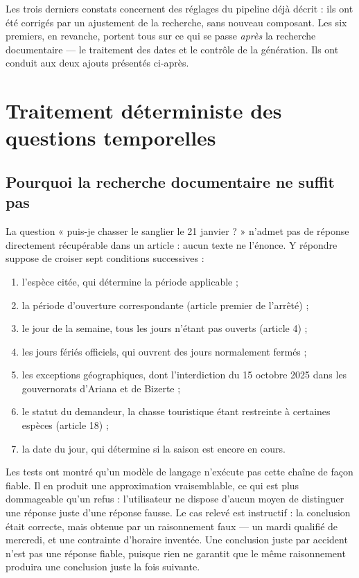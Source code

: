 Les trois derniers constats concernent des réglages du pipeline déjà décrit :
ils ont été corrigés par un ajustement de la recherche, sans nouveau composant.
Les six premiers, en revanche, portent tous sur ce qui se passe \emph{après} la
recherche documentaire — le traitement des dates et le contrôle de la
génération. Ils ont conduit aux deux ajouts présentés ci-après.


\section{Traitement déterministe des questions temporelles}
\label{sec:calendrier}

\subsection{Pourquoi la recherche documentaire ne suffit pas}

La question « puis-je chasser le sanglier le 21 janvier ? » n'admet pas de
réponse directement récupérable dans un article : aucun texte ne l'énonce. Y
répondre suppose de croiser sept conditions successives :

\begin{enumerate}
  \item l'espèce citée, qui détermine la période applicable ;
  \item la période d'ouverture correspondante (article premier de l'arrêté) ;
  \item le jour de la semaine, tous les jours n'étant pas ouverts (article 4) ;
  \item les jours fériés officiels, qui ouvrent des jours normalement fermés ;
  \item les exceptions géographiques, dont l'interdiction du 15 octobre 2025
        dans les gouvernorats d'Ariana et de Bizerte ;
  \item le statut du demandeur, la chasse touristique étant restreinte à
        certaines espèces (article 18) ;
  \item la date du jour, qui détermine si la saison est encore en cours.
\end{enumerate}

Les tests ont montré qu'un modèle de langage n'exécute pas cette chaîne de façon
fiable. Il en produit une approximation vraisemblable, ce qui est plus dommageable
qu'un refus : l'utilisateur ne dispose d'aucun moyen de distinguer une réponse
juste d'une réponse fausse. Le cas relevé est instructif : la conclusion était
correcte, mais obtenue par un raisonnement faux — un mardi qualifié de mercredi,
et une contrainte d'horaire inventée. Une conclusion juste par accident n'est pas
une réponse fiable, puisque rien ne garantit que le même raisonnement
produira une conclusion juste la fois suivante.


